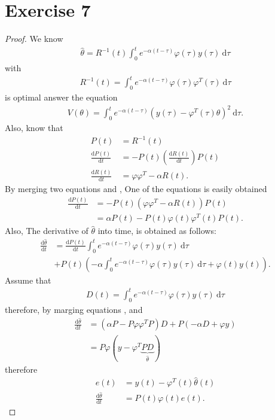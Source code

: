 \section*{Exercise 7}
\begin{proof}
    
We know
\begin{align}
    \hat{\theta} = R^{-1}(t)\int_0^t e^{-\alpha(t-\tau)}\varphi(\tau)y(\tau)\:\mathrm{d}\tau
\end{align}
with
\begin{align*}
    R^{-1}(t) = \int_0^t e^{-\alpha(t-\tau)}\varphi(\tau)\varphi^T(\tau)\:\mathrm{d}\tau
\end{align*}
is optimal answer the equation
\begin{align}
    V(\theta) = \int_0^t e^{-\alpha(t-\tau)}(y(\tau) - \varphi^T(\tau)\theta)^2\:\mathrm{d}\tau .
\end{align}
Also, know that
\begin{align}
    P(t) &= R^{-1}(t) \label{eq.7.1}\\
    \frac{\mathrm{d}P(t)}{\mathrm{d}t} &= -P(t)\left(\frac{\mathrm{d}R(t)}{\mathrm{d}t}\right)P(t) \label{eq.7.2}\\
    \frac{\mathrm{d}R(t)}{\mathrm{d}t} &= \varphi\varphi^T -\alpha R(t) \label{eq.7.3}.
\end{align}
By merging two equations  and , One of the equations is easily obtained
\begin{align}
    \frac{\mathrm{d}P(t)}{\mathrm{d}t} &= -P(t)\left(\varphi\varphi^T -\alpha R(t)\right)P(t) \nonumber\\
    &= \alpha P(t) - P(t)\varphi(t)\varphi^T(t)P(t) \label{eq.7.4}.
\end{align}
Also, The derivative of $\hat{\theta}$ into time, is obtained as follows:
\begin{align}
    \frac{\mathrm{d}\hat{\theta}}{\mathrm{d}t} &= \frac{\mathrm{d}P(t)}{\mathrm{d}t}\int_0^t e^{-\alpha(t-\tau)}\varphi(\tau)y(\tau)\:\mathrm{d}\tau \nonumber\\
    &+ P(t)\left(-\alpha\int_0^t e^{-\alpha(t-\tau)}\varphi(\tau)y(\tau)\:\mathrm{d}\tau + \varphi(t)y(t)\right). \label{eq.7.5}
\end{align}
Assume that
\begin{align}
    D(t) =  \int_0^t e^{-\alpha(t-\tau)}\varphi(\tau)y(\tau)\:\mathrm{d}\tau \label{eq.7.6}
\end{align}
therefore, by marging equations ,  and 
\begin{align*}
    \frac{\mathrm{d}\hat{\theta}}{\mathrm{d}t} &= (\alpha P - P\varphi\varphi^TP)D + P(-\alpha D + \varphi y) \\
    &= P\varphi(y - \varphi^T \underbrace{PD}_{\hat{\theta}})
\end{align*}
therefore
\begin{align}
    e(t) &= y(t) - \varphi^T(t)\hat{\theta}(t)\\
    \frac{\mathrm{d}\hat{\theta}}{\mathrm{d}t} &= P(t)\varphi(t)e(t).
\end{align}
\end{proof}